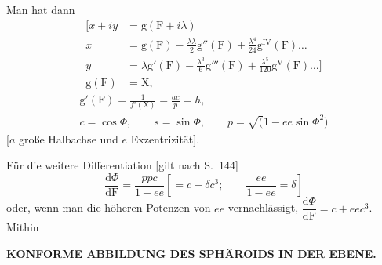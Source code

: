 Man hat dann
\[
\begin{aligned}
\mathopen{[}x+iy&=\mathrm g(\mathrm F+i\lambda)\\
x&=\mathrm g(\mathrm F)-\frac{\lambda\lambda}{2}\mathrm g''(\mathrm F)
 +\frac{\lambda^4}{24}\mathrm g^{\mathrm{IV}}(\mathrm F)\ldots\\
y&=\lambda\mathrm g'(\mathrm F)-\frac{\lambda^3}{6}\mathrm g'''(\mathrm F)
 +\frac{\lambda^5}{120}\mathrm g^{\mathrm V}(\mathrm F)\ldots]\\
\mathrm g(\mathrm F)&=\mathrm X,
\end{aligned}
\]
\noindent [wenn \(\mathrm X\) nun die Abszisse bezeichnet, die zum Schnittpunkt des
Breitenkreises \(\Phi\) mit dem Hauptmeridian gehört. Nach Art.\ 1 ist daher
\(f(\mathrm X)=\mathrm F(\Phi)\), also
\(\dfrac{\mathrm d\mathrm X}{\mathrm d\mathrm F}=\dfrac1{f'(\mathrm X)}\). Damit ergibt sich]
\[
\begin{gathered}
\mathrm g'(\mathrm F)=\frac1{f'(\mathrm X)}=\frac{ac}{p}=h,\\
c=\cos\Phi,\qquad s=\sin\Phi,\qquad p=\surd(1-ee\sin\Phi^2)
\end{gathered}
\]
[\(a\) große Halbachse und \(e\) Exzentrizität].

Für die weitere Differentiation [gilt nach S.\ 144]
\[
\frac{\mathrm d\Phi}{\mathrm d\mathrm F}=\frac{ppc}{1-ee}
 \left[=c+\delta c^3;\qquad\frac{ee}{1-ee}=\delta\right]
\]
\noindent oder, wenn man die höheren Potenzen von \(ee\) vernachlässigt,
\(\dfrac{\mathrm d\Phi}{\mathrm d\mathrm F}=c+eec^3\). Mithin

\par\clearpage
\noindent\null\hfill{\small\textbf{KONFORME ABBILDUNG DES SPHÄROIDS IN DER EBENE.}}\hfill{}\par\medskip

